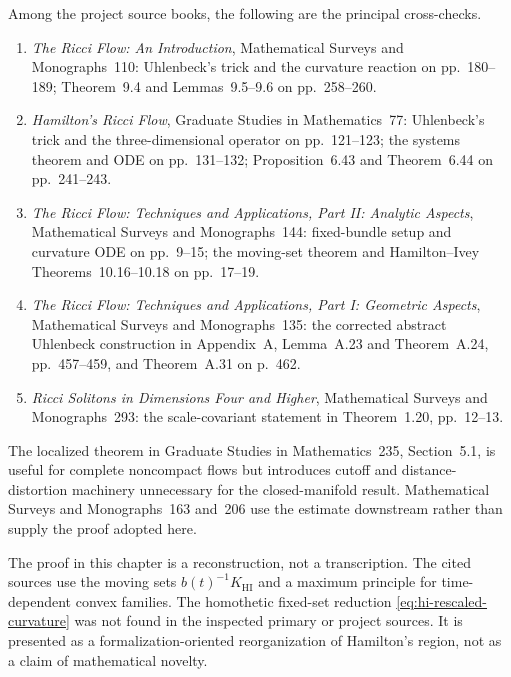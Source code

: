 \documentclass[10pt]{coll-l}
\theoremstyle{definition}
\theoremstyle{remark}
\numberwithin{section}{chapter}
\numberwithin{equation}{chapter}
\begin{document}
Among the project source books, the following are the principal
cross-checks.
\begin{enumerate}
\item \emph{The Ricci Flow: An Introduction}, Mathematical Surveys and
      Monographs~110: Uhlenbeck's trick and the curvature reaction on
      pp.~180--189; Theorem~9.4 and Lemmas~9.5--9.6 on pp.~258--260.
\item \emph{Hamilton's Ricci Flow}, Graduate Studies in Mathematics~77:
      Uhlenbeck's trick and the three-dimensional operator on pp.~121--123;
      the systems theorem and ODE on pp.~131--132; Proposition~6.43 and
      Theorem~6.44 on pp.~241--243.
\item \emph{The Ricci Flow: Techniques and Applications, Part II:
      Analytic Aspects}, Mathematical Surveys and Monographs~144:
      fixed-bundle setup and curvature ODE on pp.~9--15; the moving-set
      theorem and Hamilton--Ivey Theorems~10.16--10.18 on pp.~17--19.
\item \emph{The Ricci Flow: Techniques and Applications, Part I:
      Geometric Aspects}, Mathematical Surveys and
      Monographs~135: the corrected abstract Uhlenbeck construction in
      Appendix~A, Lemma~A.23 and Theorem~A.24, pp.~457--459, and
      Theorem~A.31 on p.~462.
\item \emph{Ricci Solitons in Dimensions Four and Higher}, Mathematical
      Surveys and Monographs~293: the scale-covariant statement in
      Theorem~1.20, pp.~12--13.
\end{enumerate}
The localized theorem in Graduate Studies in Mathematics~235,
Section~5.1, is useful for complete noncompact flows but introduces cutoff
and distance-distortion machinery unnecessary for the closed-manifold
result.  Mathematical Surveys and Monographs~163 and~206 use the estimate
downstream rather than supply the proof adopted here.

The proof in this chapter is a reconstruction, not a transcription.
The cited sources use the moving sets
$b(t)^{-1}K_{\mathrm{HI}}$ and a maximum principle for time-dependent
convex families.  The homothetic fixed-set reduction
\eqref{eq:hi-rescaled-curvature} was not found in the inspected primary or
project sources.  It is presented as a formalization-oriented
reorganization of Hamilton's region, not as a claim of mathematical
novelty.
\end{document}
